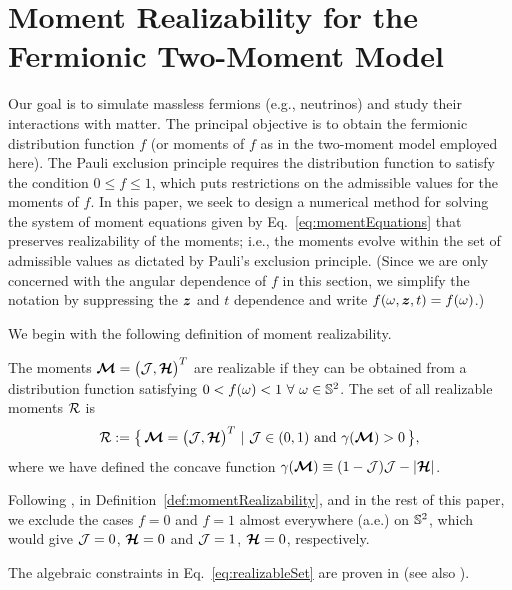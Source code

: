 \section{Moment Realizability for the Fermionic Two-Moment Model}
\label{sec:realizability}

Our goal is to simulate massless fermions (e.g., neutrinos) and study their interactions with matter.  
The principal objective is to obtain the fermionic distribution function $f$ (or moments of $f$ as in the two-moment model employed here).  
The Pauli exclusion principle requires the distribution function to satisfy the condition $0 \le f \le 1$, which puts restrictions on the admissible values for the moments of $f$.  
In this paper, we seek to design a numerical method for solving the system of moment equations given by Eq.~\eqref{eq:momentEquations} that preserves realizability of the moments; i.e., the moments evolve within the set of admissible values as dictated by Pauli's exclusion principle.  
(Since we are only concerned with the angular dependence of $f$ in this section, we simplify the notation by suppressing the $\boldsymbol{z}$ and $t$ dependence and write $f(\omega,\boldsymbol{z},t)=f(\omega)$.)  

We begin with the following definition of moment realizability.  
\begin{define}
  The moments $\boldsymbol{\mathcal{M}}=\big(\mathcal{J},\boldsymbol{\mathcal{H}}\big)^{T}$ are realizable if they can be obtained from a distribution function satisfying $0 < f(\omega) < 1~\forall~\omega\in\mathbb{S}^{2}$.  
  The set of all realizable moments $\mathcal{R}$ is
  \begin{equation}
    \mathcal{R}:=\big\{\,\boldsymbol{\mathcal{M}}=\big(\mathcal{J},\boldsymbol{\mathcal{H}}\big)^{T}~|~\mathcal{J}\in(0,1)~\text{and}~\gamma(\boldsymbol{\mathcal{M}}) > 0\,\big\},
    \label{eq:realizableSet}
  \end{equation}
  where we have defined the concave function $\gamma(\boldsymbol{\mathcal{M}})\equiv(1-\mathcal{J})\mathcal{J}-|\boldsymbol{\mathcal{H}}|$.  
  \label{def:momentRealizability}
\end{define}
\begin{rem}
  Following \cite{lareckiBanach_2011}, in Definition~\ref{def:momentRealizability}, and in the rest of this paper, we exclude the cases $f=0$ and $f=1$ almost everywhere (a.e.) on $\mathbb{S}^{2}$, which would give $\mathcal{J}=0$, $\boldsymbol{\mathcal{H}}=0$ and $\mathcal{J}=1$, $\boldsymbol{\mathcal{H}}=0$, respectively.  
\end{rem}

The algebraic constraints in Eq.~\eqref{eq:realizableSet} are proven in \cite{banachLarecki_2017a} (see also \cite{lareckiBanach_2011,banachLarecki_2013}).  

